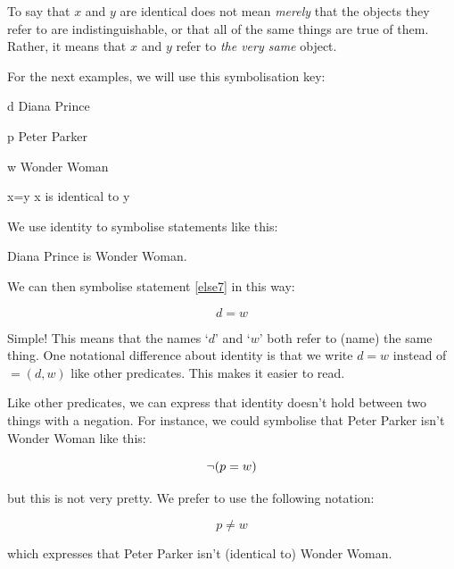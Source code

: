 \documentclass[PHIL101-Textbook.tex]{subfiles}
\begin{document}
\noindent To say that $x$ and $y$ are identical does not mean \emph{merely} that the objects they refer to are indistinguishable, or that all of the same things are true of them.
Rather, it means that $x$ and $y$ refer to \emph{the very same} object.

For the next examples, we will use this symbolisation key:

\begin{ekey}
\item[d] Diana Prince
\item[p] Peter Parker
\item[w] Wonder Woman
\item[x=y] x is identical to y
\end{ekey}

We use identity to symbolise statements like this: 
\begin{earg}
\item[\ex{else7}] Diana Prince is Wonder Woman.
\end{earg}

\noindent We can then symbolise statement \ref{else7} in this way:

$$d = w$$

\noindent Simple!
This means that the names `$d$' and `$w$' both refer to (name) the same thing.
One notational difference about identity is that we write $d = w$ instead of $= (d, w)$ like other predicates.
This makes it easier to read.


Like other predicates, we can express that identity doesn't hold between two things with a negation.
For instance, we could symbolise that Peter Parker isn't Wonder Woman like this:

$$\neg (p = w)$$

\noindent but this is not very pretty.
We prefer to use the following notation:

$$p \neq w$$

\noindent which expresses that Peter Parker isn't (identical to) Wonder Woman. \\
\end{document}
